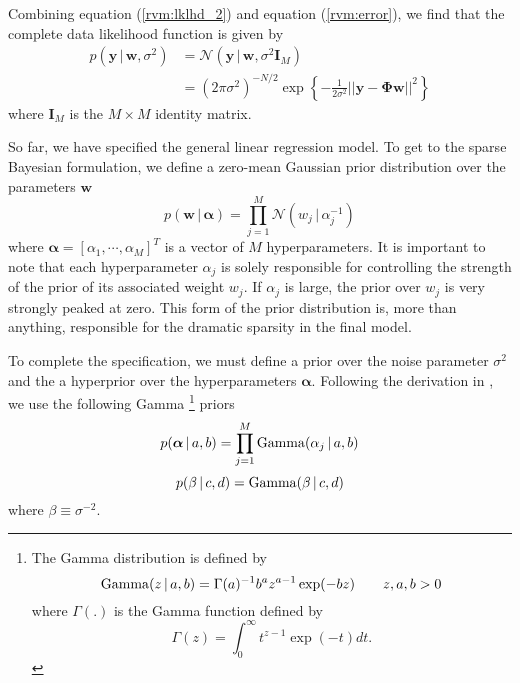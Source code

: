 Combining equation (\ref{rvm:lklhd_2}) and equation (\ref{rvm:error}), we find that the complete data likelihood function is given by
\begin{equation}
  \label{rvm:complete_lk}
  \begin{split}
    p\left(\bm y\,|\,\bm w,\sigma^2\right) &= \mathcal{N}\left(\bm y\,|\,\bm w,\sigma^2 \bm I_M\right)\\
    &= (2\pi\sigma^2)^{-N/2} \exp\left\{-\frac{1}{2\sigma^2}||\bm y - \bm\Phi\bm w||^2\right\}
  \end{split}
\end{equation}
where $\bm I_M$ is the $M\times M$ identity matrix.

So far, we have specified the general linear regression model.
To get to the sparse Bayesian formulation, we define a zero-mean Gaussian prior distribution over the parameters $\bm w$
\begin{equation*}
  p(\bm w\,|\,\bm \alpha) = \prod_{j=1}^M \mathcal{N}\left(w_j\,|\,\alpha_j^{-1}\right)
\end{equation*}
where $\bm \alpha = \left[\alpha_1,\cdots,\alpha_M\right]^T$ is a vector of $M$ hyperparameters.
It is important to note that each hyperparameter $\alpha_j$ is solely responsible for controlling the strength of the prior of its associated weight $w_j$.
If $\alpha_j$ is large, the prior over $w_j$ is very strongly peaked at zero.
This form of the prior distribution is, more than anything, responsible for the dramatic sparsity in the final model.

To complete the specification, we must define a prior over the noise parameter $\sigma^2$ and the a hyperprior over the hyperparameters $\bm \alpha$.
Following the derivation in \cite{tipping2001}, we use the following Gamma
\footnote{
The Gamma distribution is defined by   
\[
\operatorname*{Gamma}(z\,|\,a,b) = \Gamma(a)^{-1} b^a z^{a-1} \exp(-bz)  \qquad z,a,b > 0
\]
where $\Gamma(.)$ is the Gamma function defined by 
\[
\Gamma(z) = \int_0^\infty t^{z-1} \exp(-t) dt.
\]
} priors
\begin{equation*}
  p(\bm\alpha\,|\,a,b) = \prod_{j=1}^M \operatorname*{Gamma}(\alpha_j\,|\,a,b)
\end{equation*}
\begin{equation*}
  p(\beta\,|\,c,d) = \operatorname*{Gamma}(\beta\,|\,c,d)
\end{equation*}
where $\beta \equiv \sigma^{-2}$.

